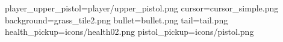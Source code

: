 player_upper_pistol=player/upper_pistol.png
cursor=cursor_simple.png
background=grass_tile2.png
bullet=bullet.png
tail=tail.png
health_pickup=icons/health02.png
pistol_pickup=icons/pistol.png
